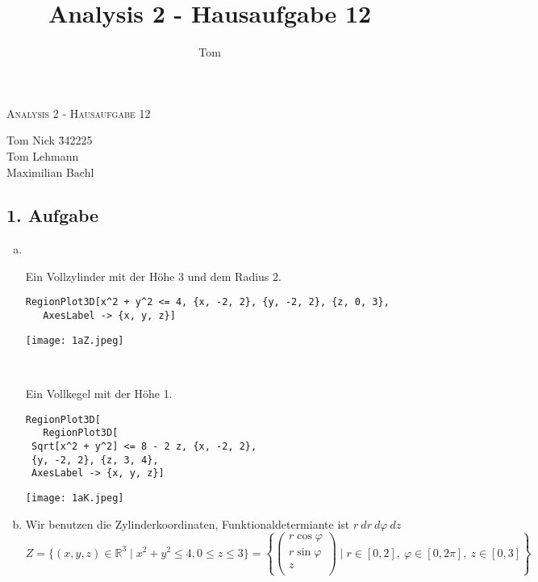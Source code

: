 \documentclass[10pt,a4paper,parskip=half]{scrartcl}
\author{Tom}
\title{Analysis 2 - Hausaufgabe 12}
\newcommand{\R}{\mathbb{R}}
\newcommand{\vecthree}[3]{\begin{pmatrix}#1\\#2\\#3\\\end {pmatrix}}
\begin{document}
\begin{center}
\textsc{\Large{Analysis 2 - Hausaufgabe 12}} \\
\end{center}
\begin{tabbing}
Tom Nick \hspace{1.4cm}\= 342225\\
Tom Lehmann\\
Maximilian Bachl
\end{tabbing}
\subsection*{1. Aufgabe}
\begin{enumerate}[(a)]
   \item \ \\
   \begin{minipage}{0.50\columnwidth}
   Ein Vollzylinder mit der Höhe 3 und dem Radius 2.
   \begin{lstlisting}[caption= Mathematica Code für die Menge Z]
   RegionPlot3D[x^2 + y^2 <= 4, {x, -2, 2}, {y, -2, 2}, {z, 0, 3}, 
   AxesLabel -> {x, y, z}]
   \end{lstlisting}
   \end{minipage}
   \begin{minipage}{0.50\columnwidth}
   \begin{center}
   \texttt{[image: 1aZ.jpeg]} 
   \end{center}
   \end{minipage}
   \ \\
   \begin{minipage}{0.50\columnwidth}
   Ein Vollkegel mit der Höhe 1.
   \begin{lstlisting}[caption= Mathematica Code für die Menge K]
   RegionPlot3D[
   RegionPlot3D[
 Sqrt[x^2 + y^2] <= 8 - 2 z, {x, -2, 2}, 
 {y, -2, 2}, {z, 3, 4}, 
 AxesLabel -> {x, y, z}]
   \end{lstlisting}
   \end{minipage}
   \begin{minipage}{0.50\columnwidth}
   \begin{center}
   \texttt{[image: 1aK.jpeg]} 
   \end{center}
   \end{minipage}
   \item  
   Wir benutzen die Zylinderkoordinaten, Funktionaldetermiante ist $r~dr ~ d\varphi ~dz$
   \[ Z = \{ (x,y,z) \in \R^3  \mid x^2 + y^2 \le 4, 0 \le z \le 3\} = \left\{ \vecthree{r \cos \varphi}{r\sin \varphi}{z} \mid r \in [0,2] ,~ \varphi \in [0,2\pi], ~z \in [0,3] \right\} \] 

\end{enumerate}
\end{document}
